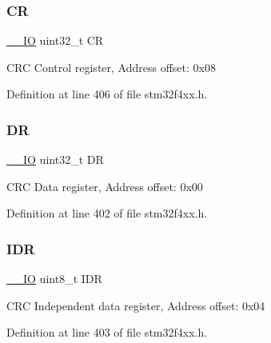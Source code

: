 \subsubsection{\texorpdfstring{CR}{CR}}
{\footnotesize\ttfamily \hyperlink{group___c_m_s_i_s__core__definitions_gaec43007d9998a0a0e01faede4133d6be}{\+\_\+\+\_\+\+IO} uint32\+\_\+t CR}

C\+RC Control register, Address offset\+: 0x08 

Definition at line 406 of file stm32f4xx.\+h.

\mbox{\label{struct_c_r_c___type_def_a3df0d8dfcd1ec958659ffe21eb64fa94}} 
\subsubsection{\texorpdfstring{DR}{DR}}
{\footnotesize\ttfamily \hyperlink{group___c_m_s_i_s__core__definitions_gaec43007d9998a0a0e01faede4133d6be}{\+\_\+\+\_\+\+IO} uint32\+\_\+t DR}

C\+RC Data register, Address offset\+: 0x00 

Definition at line 402 of file stm32f4xx.\+h.

\mbox{\label{struct_c_r_c___type_def_a601d7b0ba761c987db359b2d7173b7e0}} 
\subsubsection{\texorpdfstring{I\+DR}{IDR}}
{\footnotesize\ttfamily \hyperlink{group___c_m_s_i_s__core__definitions_gaec43007d9998a0a0e01faede4133d6be}{\+\_\+\+\_\+\+IO} uint8\+\_\+t I\+DR}

C\+RC Independent data register, Address offset\+: 0x04 

Definition at line 403 of file stm32f4xx.\+h.

\mbox{\label{struct_c_r_c___type_def_aa7d2bd5481ee985778c410a7e5826b71}} 
